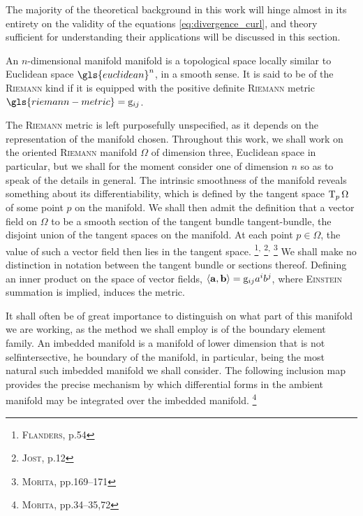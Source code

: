 The majority of the theoretical background in this work will hinge almost in its entirety on the validity of the equations \eqref{eq:divergence_curl}, and theory sufficient for understanding their applications will be discussed in this section.

\begin{definition}
  An $n$-dimensional manifold \gls{manifold} is a topological space locally similar to Euclidean space $\gls{euclidean}^n$, in  a smooth sense.
  It is said to be of the \textsc{Riemann} kind if it is equipped with the positive definite \textsc{Riemann} metric $\gls{riemann-metric} = \metricg_{ij}$.
\end{definition}

\noindent
The \textsc{Riemann} metric is left purposefully unspecified, as it depends on the representation of the manifold chosen.
Throughout this work, we shall work on the oriented \textsc{Riemann} manifold $\Omega$ of dimension three, Euclidean space in particular, but we shall for the moment consider one of dimension $n$ so as to speak of the details in general.
The intrinsic smoothness of the manifold reveals something about its differentiability, which is defined by the tangent space $\operatorname{T}_p\Omega$ of some point $p$ on the manifold.
We shall then admit the definition that a vector field on $\Omega$ to be a smooth section of the tangent bundle \gls{tangent-bundle}, the disjoint union of the tangent spaces on the manifold.
At each point $p \in \Omega$, the value of such a vector field then lies in the tangent space.%
\footnote{%
  \cite{flanders1989differential} \textsc{Flanders}, p.54
}\textsuperscript{,}%
\footnote{%
  \cite{jost2011riemannian} \textsc{Jost}, p.12
}\textsuperscript{,}%
\footnote{%
  \cite{morita2001geometry} \textsc{Morita}, pp.169--171
}
We shall make no distinction in notation between the tangent bundle or sections thereof.
Defining an inner product on the space of vector fields, $\langle \mathbf{a}, \mathbf{b} \rangle = \mathrm{g}_{ij} a^{i} b^{j}$, where \textsc{Einstein} summation is implied, induces the metric.

It shall often be of great importance to distinguish on what part of this manifold we are working, as the method we shall employ is of the boundary element family.
An imbedded manifold is a manifold of lower dimension that is not selfintersective, he boundary of the manifold, in particular, being the most natural such imbedded manifold we shall consider.
The following inclusion map provides the precise mechanism by which differential forms in the ambient manifold may be integrated over the imbedded manifold.%
\footnote{
  \cite{morita2001geometry} \textsc{Morita}, pp.34--35,72
}

